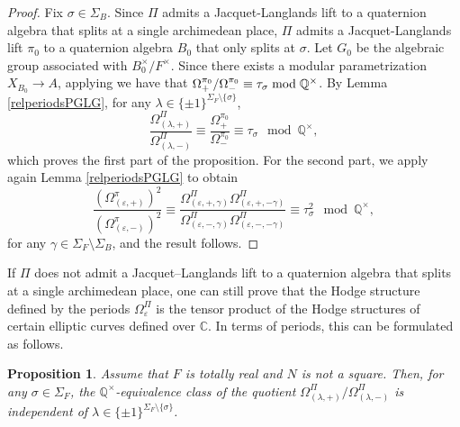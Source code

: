 \documentclass{amsart}
\newtheorem{proposition}[theorem]{Proposition}
\theoremstyle{definition}
\theoremstyle{remark}
\numberwithin{equation}{section}
\newcommand{\Q}{{\mathbb Q}}
\newcommand{\C}{{\mathbb C}}
\newcommand{\ra}{{\rightarrow}}
\begin{document}
\begin{proof}
Fix $\sigma\in\Sigma_B$. Since $\Pi$ admits a Jacquet-Langlands  lift  to a quaternion algebra that splits at a single archimedean place,  $\Pi$ admits a Jacquet-Langlands  lift $\pi_0$ to a quaternion algebra $B_0$ that only splits at $\sigma$. Let $G_0$ be the algebraic group associated with $B_0^\times /F^\times$. Since there exists a modular parametrization $X_{B_0}\ra A$, applying \cite{ESsanti} we have that $\Omega^{\pi_0}_{+}/\Omega^{\pi_0}_{-}\equiv \tau_\sigma\;{\rm mod}\;\Q^\times$.
By Lemma \ref{relperiodsPGLG}, for any $\lambda\in\{\pm 1\}^{\Sigma_F\setminus\{\sigma\}}$,
\begin{equation*}
  \frac{\Omega_{(\lambda,+)}^\Pi}{\Omega_{(\lambda,-)}^\Pi}\equiv\frac{\Omega^{\pi_0}_+}{\Omega^{\pi_0}_-}\equiv \tau_\sigma \mod\Q^\times,
\end{equation*}
which proves the first part of the proposition. For the second part, we apply again Lemma \ref{relperiodsPGLG} to obtain
\begin{equation*}
\frac{(\Omega^{\pi}_{(\varepsilon,+)})^2}{(\Omega^{\pi}_{(\varepsilon,-)})^2}\equiv\frac{\Omega_{(\varepsilon,+,\gamma)}^\Pi\Omega_{(\varepsilon,+,-\gamma)}^\Pi}{\Omega_{(\varepsilon,-,\gamma)}^\Pi\Omega_{(\varepsilon,-,-\gamma)}^\Pi}\equiv \tau_\sigma^2\mod\Q^\times,
\end{equation*}
for any $\gamma\in\Sigma_F\setminus\Sigma_B$, and the result follows.
\end{proof}
If $\Pi$ does not admit a Jacquet–Langlands lift to a quaternion algebra that splits at a single archimedean place, one can still prove that the Hodge structure defined by the periods $\Omega_\varepsilon^\Pi$  is the tensor product of the Hodge structures of certain elliptic curves defined over $\C$. In terms of periods, this  can be formulated as follows.
\begin{proposition}\label{oldOda2}
Assume that $F$ is totally real and $N$ is not a square. Then, for any $\sigma\in\Sigma_F$, the $\Q^\times$-equivalence class of the quotient $ \Omega^\Pi_{(\lambda,+)}/\Omega^\Pi_{(\lambda,-)}$ is independent of $\lambda\in\{\pm 1\}^{\Sigma_F\setminus\{\sigma\}}$.
\end{proposition}
\end{document}
